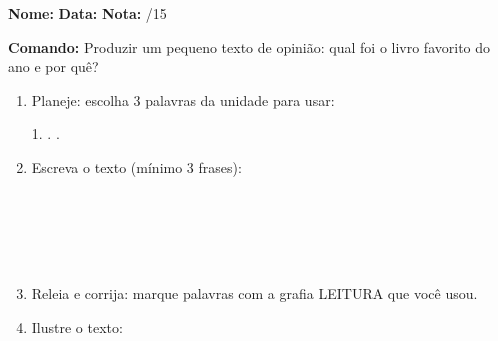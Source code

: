 \begin{exercicio}

\noindent\textbf{Nome:} \underline{\hspace{3.2cm}} \quad \textbf{Data:} \underline{\hspace{1.6cm}} \quad \textbf{Nota:} \underline{\hspace{0.9cm}}/15


\noindent\textbf{Comando:} Produzir um pequeno texto de opinião: qual foi o livro favorito do ano e por quê?


\begin{enumerate}

  \item Planeje: escolha 3 palavras da unidade para usar:
  \begin{center}
  1. \underline{\hspace{3cm}} . \underline{\hspace{3cm}} . \underline{\hspace{3cm}}
  \end{center}

  \item Escreva o texto (mínimo 3 frases):
  \begin{center}
  \underline{\hspace{12cm}}\\\underline{\hspace{12cm}}\\\underline{\hspace{12cm}}\\\underline{\hspace{12cm}}\\\underline{\hspace{12cm}}
  \end{center}

  \item Releia e corrija: marque palavras com a grafia LEITURA que você usou.

  \item Ilustre o texto:
  \begin{center}
  \end{center}

\end{enumerate}

\end{exercicio}


